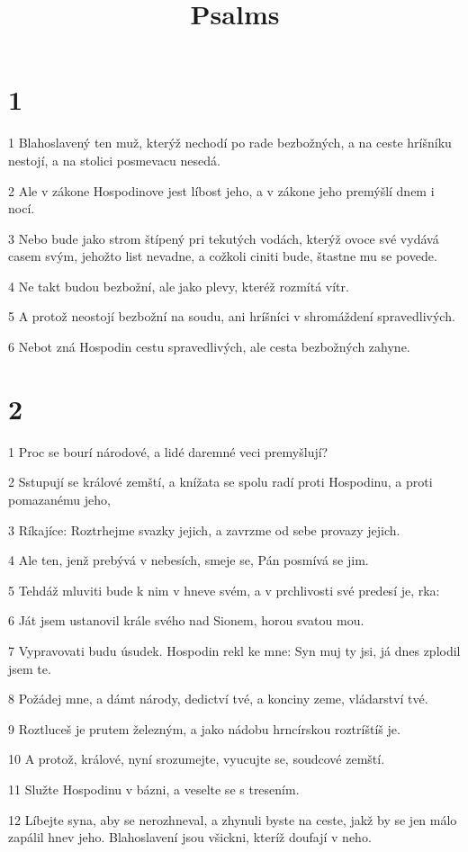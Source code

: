 

\title{Psalms}

\chapter{1}

\par 1 Blahoslavený ten muž, kterýž nechodí po rade bezbožných, a na ceste hríšníku nestojí, a na stolici posmevacu nesedá.
\par 2 Ale v zákone Hospodinove jest líbost jeho, a v zákone jeho premýšlí dnem i nocí.
\par 3 Nebo bude jako strom štípený pri tekutých vodách, kterýž ovoce své vydává casem svým, jehožto list nevadne, a cožkoli ciniti bude, štastne mu se povede.
\par 4 Ne takt budou bezbožní, ale jako plevy, kteréž rozmítá vítr.
\par 5 A protož neostojí bezbožní na soudu, ani hríšníci v shromáždení spravedlivých.
\par 6 Nebot zná Hospodin cestu spravedlivých, ale cesta bezbožných zahyne.

\chapter{2}

\par 1 Proc se bourí národové, a lidé daremné veci premyšlují?
\par 2 Sstupují se králové zemští, a knížata se spolu radí proti Hospodinu, a proti pomazanému jeho,
\par 3 Ríkajíce: Roztrhejme svazky jejich, a zavrzme od sebe provazy jejich.
\par 4 Ale ten, jenž prebývá v nebesích, smeje se, Pán posmívá se jim.
\par 5 Tehdáž mluviti bude k nim v hneve svém, a v prchlivosti své predesí je, rka:
\par 6 Ját jsem ustanovil krále svého nad Sionem, horou svatou mou.
\par 7 Vypravovati budu úsudek. Hospodin rekl ke mne: Syn muj ty jsi, já dnes zplodil jsem te.
\par 8 Požádej mne, a dámt národy, dedictví tvé, a konciny zeme, vládarství tvé.
\par 9 Roztluceš je prutem železným, a jako nádobu hrncírskou roztríštíš je.
\par 10 A protož, králové, nyní srozumejte, vyucujte se, soudcové zemští.
\par 11 Služte Hospodinu v bázni, a veselte se s tresením.
\par 12 Líbejte syna, aby se nerozhneval, a zhynuli byste na ceste, jakž by se jen málo zapálil hnev jeho. Blahoslavení jsou všickni, kteríž doufají v neho.


